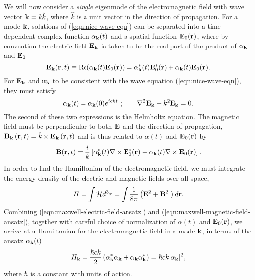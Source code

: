 \newcommand{\kmode}{\vk}
\newcommand{\alphak}{\alpha_{\kmode}}
We will now consider a \emph{single} eigenmode of the electromagnetic field with wave vector $\mathbf{k} = k \hat{k}$, where $\hat{k}$ is a unit vector in the direction of propagation.
For a mode $\mathbf{k}$, solutions of (\ref{eqn:nice-wave-eqn}) can be separated into a time-dependent complex function $\alphak(t)$ and a spatial function $\mathbf{E}_0(\mathbf{r})$, where by convention the electric field $\mathbf{E}_{\mathbf{k}}$ is taken to be the real part of the product of $\alphak$ and $\mathbf{E}_0$
\begin{equation}
    \efield_\vk(\vr, t) \equiv \mathrm{Re}(\alphak (t) \efield_0 (\vr)) = \alphak^*(t) \efield_0^* (\vr) + \alphak(t) \efield_0(\vr).
    \label{eqn:maxwell-electric-field-ansatz}
\end{equation}
For $\mathbf{E}_{\mathbf{k}}$ and $\alphak$ to be consistent with the wave equation (\ref{eqn:nice-wave-eqn}), they must satisfy
\begin{equation}
\alphak(t) = \alphak(0)e^{ickt}~;\qquad \nabla^2\efield_\vk + k^2\efield_\vk = 0.
\label{eqn:helmholtz}
\end{equation}
The second of these two expressions is the Helmholtz equation. 
%
The magnetic field must be perpendicular to both $\mathbf{E}$ and the direction of propagation, 
$\mathbf{B}_{\mathbf{k}} \left( \mathbf{r}, t \right) = \hat{k} \times \mathbf{E}_{\mathbf{k}} \left( \mathbf{r}, t \right)$
and is thus related to $\alpha(t)$ and $\mathbf{E}_0(\mathbf{r})$ by
\begin{equation}
    \bfield(\vr, t) = \frac{i}{k} 
    \left[ 
    \alphak^* (t) \nabla \times \efield_0^* (\vr) - 
    \alphak (t) \nabla \times \efield_0 (\vr)
    \right].
    \label{eqn:maxwell-magnetic-field-ansatz}
\end{equation}
In order to find the Hamiltonian of the electromagnetic field, we must integrate the energy density of the electric and magnetic fields over all space,
\begin{equation}
   H = \int \mathcal{H} d^3 r = \int \frac{1}{8\pi} \left(\mathbf{E}^2 +\mathbf{B}^2\ \right) d\mathbf{r}.
   \label{eqn:em-hamiltonian-integrate}
\end{equation}
Combining (\ref{eqn:maxwell-electric-field-ansatz}) and (\ref{eqn:maxwell-magnetic-field-ansatz}), together with careful choice of normalization of $\alpha(t)$ and $\mathbf{E}_0(\mathbf{r})$, we arrive at a Hamiltonian for the electromagnetic field in a mode $\mathbf{k}$, in terms of the ansatz $\alphak(t)$ 
\begin{equation}
   H_\vk = \frac{\hbar c k}{2} \left( \alphak^* \alphak + \alphak \alphak^*\right)
   =\hbar c k |\alphak|^2 ,
   \label{eqn:maxwell-hamiltonian-ansatz}
\end{equation}
where $\hbar$ is a constant with units of action.



